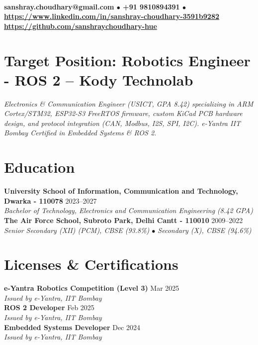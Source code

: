 \documentclass[10pt,a4paper]{article}%
\begin{document}
%
\normalsize%
 \vspace{3pt}\\%
\noindent \textbf{\scriptsize sanshray.choudhary@gmail.com $\bullet$ +91 9810894391 $\bullet$ \href{https://www.linkedin.com/in/sanshray-choudhary-3591b9282}{https://www.linkedin.com/in/sanshray-choudhary-3591b9282} \\ \href{https://github.com/sanshraychoudhary-hue}{https://github.com/sanshraychoudhary-hue}} \vspace{6pt}%

\section*{Target Position: Robotics Engineer - ROS 2 -- Kody Technolab}%
\noindent \textit{Electronics \& Communication Engineer (USICT, GPA 8.42) specializing in ARM Cortex/STM32, ESP32-S3 FreeRTOS firmware, custom KiCad PCB hardware design, and protocol integration (CAN, Modbus, I2S, SPI, I2C). e-Yantra IIT Bombay Certified in Embedded Systems \& ROS 2.} \vspace{6pt}%

\section*{Education}%
\noindent \textbf{University School of Information, Communication and Technology, Dwarka - 110078} \hfill 2023--2027 \\%
\indent \textit{Bachelor of Technology, Electronics and Communication Engineering (8.42 GPA)} \vspace{6pt}\\%
\noindent \textbf{The Air Force School, Subroto Park, Delhi Cantt - 110010} \hfill 2009--2022 \\%
\indent \textit{Senior Secondary (XII) (PCM), CBSE (93.8\%) $\bullet$ Secondary (X), CBSE (94.6\%)} \vspace{6pt}%

\section*{Licenses \& Certifications}%
\noindent \textbf{e-Yantra Robotics Competition (Level 3)} \hfill Mar 2025 \\%
\indent \textit{Issued by e-Yantra, IIT Bombay} \vspace{4pt}\\%
\noindent \textbf{ROS 2 Developer} \hfill Feb 2025 \\%
\indent \textit{Issued by e-Yantra, IIT Bombay} \vspace{4pt}\\%
\noindent \textbf{Embedded Systems Developer} \hfill Dec 2024 \\%
\indent \textit{Issued by e-Yantra, IIT Bombay} \vspace{6pt}%
\end{document}
